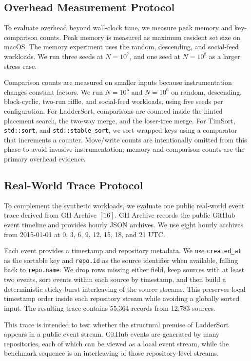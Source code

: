 \documentclass[10pt]{article}
\begin{document}
\subsection{Overhead Measurement Protocol}
\label{overhead-measurement-protocol}

To evaluate overhead beyond wall-clock time, we measure peak memory and key-comparison counts. Peak memory is measured as maximum resident set size on macOS. The memory experiment uses the random, descending, and social-feed workloads. We run three seeds at \(N=10^7\), and one seed at \(N=10^8\) as a larger stress case.

Comparison counts are measured on smaller inputs because instrumentation changes constant factors. We run \(N=10^5\) and \(N=10^6\) on random, descending, block-cyclic, two-run riffle, and social-feed workloads, using five seeds per configuration. For LadderSort, comparisons are counted inside the hinted placement search, the two-way merge, and the loser-tree merge. For TimSort, \texttt{std::sort}, and \texttt{std::stable\_sort}, we sort wrapped keys using a comparator that increments a counter. Move/write counts are intentionally omitted from this phase to avoid invasive instrumentation; memory and comparison counts are the primary overhead evidence.

\subsection{Real-World Trace Protocol}
\label{real-trace-protocol}

To complement the synthetic workloads, we evaluate one public real-world event trace derived from GH Archive \([16]\). GH Archive records the public GitHub event timeline and provides hourly JSON archives. We use eight hourly archives from 2015-01-01 at 0, 3, 6, 9, 12, 15, 18, and 21 UTC.

Each event provides a timestamp and repository metadata. We use \texttt{created\_at} as the sortable key and \texttt{repo.id} as the source identifier when available, falling back to \texttt{repo.name}. We drop rows missing either field, keep sources with at least two events, sort events within each source by timestamp, and then build a deterministic sticky-burst interleaving of the source streams. This preserves local timestamp order inside each repository stream while avoiding a globally sorted input. The resulting trace contains 55,364 records from 12,783 sources.

This trace is intended to test whether the structural premise of LadderSort appears in a public event stream. GitHub events are generated by many repositories, each of which can be viewed as a local event stream, while the benchmark sequence is an interleaving of those repository-level streams.
\end{document}
